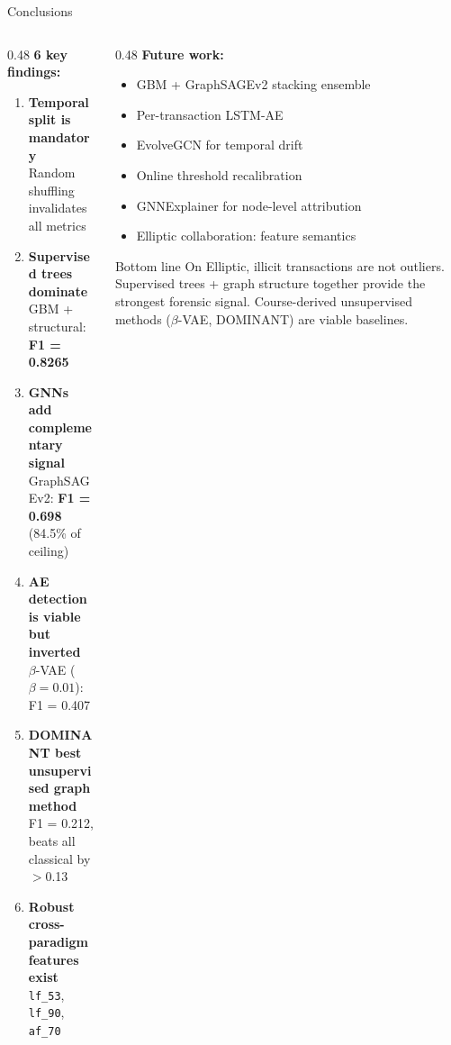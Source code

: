 \documentclass[aspectratio=169,11pt]{beamer}
\newcommand{\ok}[1]{\textcolor{good}{\textbf{#1}}}
\begin{document}
\begin{frame}{Conclusions}
  \begin{columns}[T]
    \begin{column}{0.48\textwidth}
      \textbf{6 key findings:}
      \begin{enumerate}\small
        \item \textbf{Temporal split is mandatory}\\
              Random shuffling invalidates all metrics
        \item \textbf{Supervised trees dominate}\\
              GBM + structural: \ok{F1 = 0.8265}
        \item \textbf{GNNs add complementary signal}\\
              GraphSAGEv2: \ok{F1 = 0.698} (84.5\% of ceiling)
        \item \textbf{AE detection is viable but inverted}\\
              $\beta$-VAE ($\beta{=}0.01$): F1 = 0.407
        \item \textbf{DOMINANT best unsupervised graph method}\\
              F1 = 0.212, beats all classical by $>$0.13
        \item \textbf{Robust cross-paradigm features exist}\\
              \texttt{lf\_53}, \texttt{lf\_90}, \texttt{af\_70}
      \end{enumerate}
    \end{column}
    \begin{column}{0.48\textwidth}
      \textbf{Future work:}
      \begin{itemize}\small
        \item GBM + GraphSAGEv2 stacking ensemble
        \item Per-transaction LSTM-AE
        \item EvolveGCN for temporal drift
        \item Online threshold recalibration
        \item GNNExplainer for node-level attribution
        \item Elliptic collaboration: feature semantics
      \end{itemize}
      \vspace{10pt}
      \begin{block}{Bottom line}
        \small On Elliptic, illicit transactions are not outliers.
        Supervised trees + graph structure together provide the
        strongest forensic signal. Course-derived unsupervised
        methods ($\beta$-VAE, DOMINANT) are viable baselines.
      \end{block}
    \end{column}
  \end{columns}
\end{frame}
\end{document}
